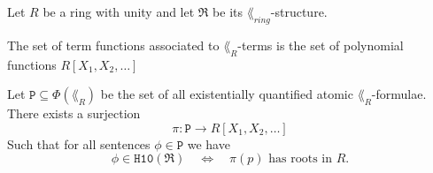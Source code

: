 \begin{thm}\label{thm:Diophantine theory}
  Let \(R\) be a ring with unity and let \(\mathfrak{R}\) be its
  \(\lang_{ring}\)-structure.
  \begin{thmlist}
    \item The set of term functions associated to \(\lang_R\)-terms is the set
    of polynomial functions \(R[X_1, X_2, …]\)

    \item Let \(\mathtt{P} \subseteq Φ(\lang_R)\) be the set of all
    existentially quantified atomic \(\lang_R\)-formulae. There exists a
    surjection
    \[
      π: \mathtt{P} → R[X_1, X_2, …]
    \]
    Such that for all sentences \(ϕ ∈ \mathtt{P}\) we have
    \[
      ϕ ∈ \mathtt{H10}(\mathfrak{R}) \quad ⇔ \quad
      π(p) \text{ has roots in } R.
    \]
  \end{thmlist}
\end{thm}

